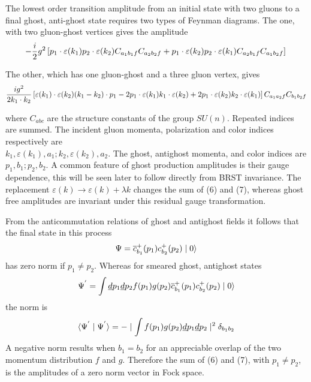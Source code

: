 \documentclass[a4paper,12pt]{article}
\begin{document}
The lowest order transition amplitude from an initial state with two gluons to a final ghost, anti-ghost state requires two types of Feynman diagrams. The one, with two gluon-ghost vertices gives the amplitude
\begin{equation}- \frac{i}{2}g^{2} \left[p_{1} \cdot \varepsilon (k_{1}) p_{2} \cdot \varepsilon(k_{2})  C_{a_{1}b_{1}f}  C_{a_{2}b_{2}f} + p_{1} \cdot \varepsilon (k_{2}) p_{2} \cdot \varepsilon(k_{1})   C_{a_{2}b_{1}f}  C_{a_{1}b_{2}f} \right]\\
\end{equation}

The other, which has one gluon-ghost and a three gluon vertex, gives
\begin{equation}\frac{ig^{2}}{2k_{1}\cdot k_{2}} \left[\varepsilon(k_{1}) \cdot \varepsilon (k_{2}) (k_{1}-k_{2}) \cdot p_{1} - 2 p_{1} \cdot \varepsilon (k_{1}) k_{1} \cdot \varepsilon(k_{2}) + 2 p_{1} \cdot \varepsilon (k_{2}) k_{2} \cdot \varepsilon (k_{1}) \right] C_{a_{1}a_{2}f} C_{b_{1}b_{2}f}\\
\end{equation}

where $C_{abc}$ are the structure constants of the group $SU(n)$. Repeated indices are summed.  The incident gluon momenta, polarization and color indices respectively are\\
\noindent
$k_{1},\varepsilon(k_{1}),a_{1}; k_{2}, \varepsilon(k_{2}),a_{2}$.  The ghost, antighost momenta, and color indices are $p_{1}, b_{1};p_{2},b_{2}$.  A common feature of 
ghost production amplitudes is their gauge dependence, this will be seen later to follow directly from BRST invariance.  The replacement $\varepsilon(k)\rightarrow\varepsilon(k)+\lambda k$ changes the sum of (6) and (7), whereas ghost free amplitudes are invariant under this residual gauge transformation.

From the anticommutation relations of ghost and antighost fields it follows that the final state in this process
\begin{equation}
\Psi=\overline{c}_{b_{1}}^{+}(p_{1})c_{b_{2}}^{+}(p_{2})\mid  0 \rangle\\
\end{equation}
has zero norm if $p_{1}\neq p_{2}$.  Whereas for smeared ghost, antighost states
\begin{equation}
\Psi^{'}=\int \underline{d}p_{1} \underline{d}p_{2} f(p_{1}) g(p_{2}) \overline{c}_{b_{1}}^{+}(p_{1})c_{b_{2}}^{+}(p_{2})\mid 0 \rangle\\
\end{equation} 
the norm is
\begin{equation}
\langle \Psi^{'} \mid \Psi^{'} \rangle = - \mid \int f(p_{1}) g(p_{2}) \underline{d}p_{1} \underline{d}p_{2} \mid^{2} \delta_{b_{1}b_{2}}\\
\end{equation}
A negative norm results when $b_{1}=b_{2}$ for an appreciable overlap of the two momentum distribution $f$ and $g$.  Therefore the sum of (6) and (7), with $p_{1}\neq p_{2}$, is the amplitudes of a zero norm vector in Fock space.
\end{document}
